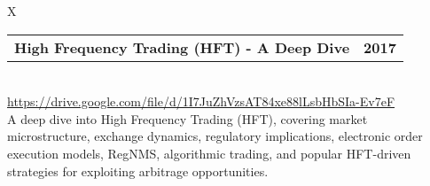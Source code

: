 \documentclass[10pt]{article}
\newcommand{\tabularxwidth}{\textwidth}
\begin{document}
        \begin{minipage}{\tabularxwidth}
        \begin{tabularx}{\tabularxwidth}{X}
            {
                \begin{tabularx}{\tabularxwidth}{@{}X r}
                    \textbf{High Frequency Trading (HFT) - A Deep Dive} &
                    \textbf{
        2017} \\
                \end{tabularx}
            } \\

            

            
                \url{https://drive.google.com/file/d/1I7JuZhVzsAT84xe88lLsbHbSIa-Ev7eF} \\
            
            

            
    A deep dive into High Frequency Trading (HFT), covering market microstructure, exchange dynamics, regulatory implications, electronic order execution models, RegNMS, algorithmic trading, and popular HFT-driven strategies for exploiting arbitrage opportunities.
        \end{tabularx}
        
            \vspace{.5em}
        

        \end{minipage}
    
\end{document}

